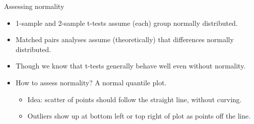 \documentclass[
  ignorenonframetext,
]{beamer}
\providecommand{\tightlist}{%
  \setlength{\itemsep}{0pt}\setlength{\parskip}{0pt}}
\begin{document}
\begin{frame}{Assessing normality}
\protect\hypertarget{assessing-normality}{}

\begin{itemize}
\tightlist
\item
  1-sample and 2-sample t-tests assume (each) group normally
  distributed.
\item
  Matched pairs analyses assume (theoretically) that differences
  normally distributed.
\item
  Though we know that t-tests generally behave well even without
  normality.
\item
  How to assess normality? A normal quantile plot.

  \begin{itemize}
  \tightlist
  \item
    Idea: scatter of points should follow the straight line, without
    curving.
  \item
    Outliers show up at bottom left or top right of plot as points off
    the line.
  \end{itemize}
\end{itemize}

\end{frame}
\end{document}

